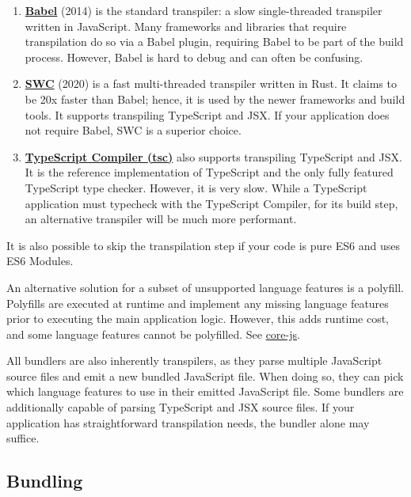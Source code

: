 \documentclass{article}
\begin{document}
\begin{enumerate}
  \item \href{https://babeljs.io/}{\textbf{Babel}} (2014) is the standard transpiler: a slow
    single-threaded transpiler written in JavaScript. Many frameworks and libraries that require
    transpilation do so via a Babel plugin, requiring Babel to be part of the build process.
    However, Babel is hard to debug and can often be confusing.

  \item \href{https://swc.rs/}{\textbf{SWC}} (2020) is a fast multi-threaded transpiler written in
    Rust. It claims to be 20x faster than Babel; hence, it is used by the newer frameworks and build
    tools. It supports transpiling TypeScript and JSX. If your application does not require Babel,
    SWC is a superior choice.

  \item \href{https://github.com/microsoft/TypeScript}{\textbf{TypeScript Compiler (tsc)}} also
    supports transpiling TypeScript and JSX. It is the reference implementation of TypeScript and
    the only fully featured TypeScript type checker. However, it is very slow. While a TypeScript
    application must typecheck with the TypeScript Compiler, for its build step, an alternative
    transpiler will be much more performant.
\end{enumerate}

It is also possible to skip the transpilation step if your code is pure ES6 and uses ES6 Modules.

An alternative solution for a subset of unsupported language features is a polyfill. Polyfills are
executed at runtime and implement any missing language features prior to executing the main
application logic. However, this adds runtime cost, and some language features cannot be polyfilled.
See \href{https://github.com/zloirock/core-js}{core-js}.

All bundlers are also inherently transpilers, as they parse multiple JavaScript source files and
emit a new bundled JavaScript file. When doing so, they can pick which language features to use in
their emitted JavaScript file. Some bundlers are additionally capable of parsing TypeScript and JSX
source files. If your application has straightforward transpilation needs, the bundler alone may
suffice.

\subsection{Bundling}
\end{document}
